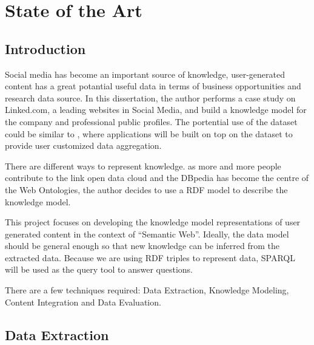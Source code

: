 \chapter{State of the Art}

\section{Introduction}

Social media has become an important source of knowledge, user-generated content has a great potantial useful data in terms of business opportunities and research data source. In this dissertation, the author performs a case study on Linked.com, a leading websites in Social Media, and build a knowledge model for the company and professional public profiles. The portential use of the dataset could be similar to \cite{li2012}, where applications will be built on top on the dataset to provide user customized data aggregation.

There are different ways to represent knowledge. as more and more people contribute to the link open data cloud\cite{bizer2009} and the DBpedia has become the centre of the Web Ontologies\cite{auer2007}, the author decides to use a RDF model to describe the knowledge model.

This project focuses on developing the knowledge model representations of user generated content in the context of “Semantic Web”. Ideally, the data model should be general enough so that new knowledge can be inferred from the extracted data. Because we are using RDF triples to represent data, SPARQL will be used as the query tool to answer questions.

There are a few techniques required: Data Extraction, Knowledge Modeling, Content Integration and Data Evaluation.

\section{Data Extraction}

